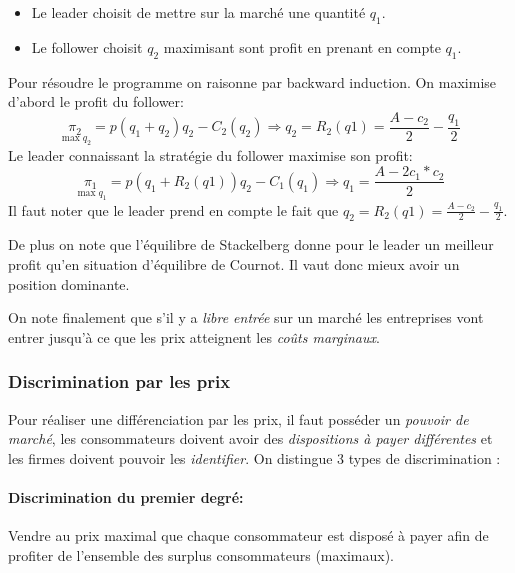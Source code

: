 \begin{tcolorbox}[title=Duopole de Stackelberg]
	
  \begin{itemize}[label=]
		\item Le leader choisit de mettre sur la marché une quantité $q_1$.
		\item Le follower choisit $q_2$ maximisant sont profit en prenant en compte $q_1$.
	\end{itemize}
	Pour résoudre le programme on raisonne par backward induction. On maximise d'abord le profit du follower:
	\[
		\underset{\max q_2}{\pi_2} = p(q_1+q_2)q_2-C_2(q_2) \Rightarrow q_2= R_2(q1)= \frac{A-c_2}{2}-\frac{q_1}{2}
	\]
	Le leader connaissant la stratégie du follower maximise son profit:
	\[
		\underset{\max q_1}{\pi_1} = p(q_1+R_2(q1))q_2-C_1(q_1) \Rightarrow q_1= \frac{A-2c_1*c_2}{2}
	\]
	Il faut noter que le leader prend en compte 
  le fait que $q_2= R_2(q1)= \frac{A-c_2}{2}-\frac{q_1}{2}$.
	
	De plus on note que l'équilibre de Stackelberg donne pour le 
  leader un meilleur profit qu'en situation d'équilibre de Cournot. 
  Il vaut donc mieux avoir un position dominante.
\end{tcolorbox}

On note finalement que s'il y a \emph{libre entrée} sur un marché 
les entreprises vont entrer jusqu'à ce que les prix atteignent les \emph{coûts marginaux}.

\subsubsection{Discrimination par les prix} %
\label{sub:discrimination_par_les_prix}
 Pour réaliser une différenciation par les prix, il faut posséder un \emph{pouvoir de marché},
 les consommateurs doivent avoir des \emph{dispositions à payer différentes} 
 et les firmes doivent pouvoir les \emph{identifier}. 
 On distingue 3 types de discrimination : 
 
 \paragraph{Discrimination du premier degré:} %
 \label{par:la_discrimination_du_premier_degre}
 Vendre au prix maximal que chaque consommateur est disposé 
 à payer afin de profiter de l'ensemble des surplus consommateurs (maximaux).
 
 
